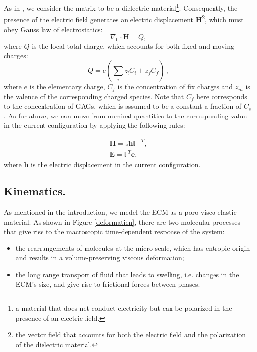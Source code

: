 \documentclass[runningheads]{llncs}
\newcommand{\F}{\ensuremath{\mathbb{F}}}
\begin{document}
As in \cite{Reviewpolyel}, we consider the matrix to be a dielectric material\footnote{a material that does not conduct electricity but can be polarized in the presence of an electric field.}. Consequently, the presence of the electric field generates an electric displacement $\mathbf{H}$\footnote{the vector field that accounts for both the electric field and the polarization of the dielectric material.}, which must obey Gauss law of electrostatics:
\begin{equation}
\nabla_0 \cdot \mathbf{H}= Q,
\label{gauss}
\end{equation}
where $Q$ is the local total charge, which accounts for both fixed and moving charges:
\begin{equation}
Q = e\left(\sum\limits_{i} z_i C_i+z_f C_{f}\right)\, , 
\end{equation}
where $e$ is the elementary charge, $C_f$ is the concentration of fix charges and $z_m$ is the valence of the corresponding charged species. Note that $C_f$ here corresponds to the concentration of GAGs, which is assumed to be a constant a fraction of $C_s$. As for above, we can move from nominal quantities to the corresponding value in the current configuration by applying the following rules:

\begin{eqnarray}
\mathbf{H} = J \mathbf{h}\F^{-T},\\
\mathbf{E} = \F^T \mathbf{e},
\end{eqnarray}
where $\mathbf{h}$ is the electric displacement in the current configuration.

\subsection{Kinematics.}
\label{kin}

As mentioned in the introduction, we model the ECM as a poro-visco-elastic material. As shown in Figure \ref{deformation}, there are two molecular processes that give rise to the macroscopic time-dependent response of the system: 
\begin{itemize}
	\item [1.] the rearrangements of molecules at the micro-scale,  which has entropic origin and results in a volume-preserving viscous deformation;
	\item[2.] the long range transport of fluid that leads to swelling, i.e. changes in the ECM's size, and give rise to frictional forces between phases. 
\end{itemize}
\end{document}

